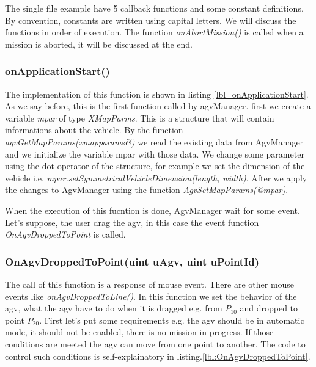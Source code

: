 The single file example have 5 callback functions and some constant definitions. By convention, constants are written using capital letters.
We will discuss the functions in order of execution. The function \textit{onAbortMission()} is called when a mission is aborted, it will be discussed at the end.

\subsubsection{onApplicationStart()}
The implementation of this function is shown in listing \ref{lbl_onApplicationStart}. As we say before, this is the first function called by agvManager.
first we create a variable \textit{mpar} of type \textit{XMapParms}. This is a structure that will contain informations about the vehicle.
By the function \textit{agvGetMapParams(xmapparams\&)} we read the existing data from AgvManager and we initialize the variable mpar with those data.
We change some parameter using the dot operator of the structure, for example we set the dimension of the vehicle i.e. \textit{mpar.setSymmetricalVehicleDimension(length, width)}. After we apply the changes to AgvManager using the function \textit{AgvSetMapParams(@mpar)}.

When the execution of this fucntion is done, AgvManager wait for some event. Let's suppose, the user drag the agv, in this case the event function \textit{OnAgvDroppedToPoint} is called.




\subsubsection{OnAgvDroppedToPoint(uint uAgv, uint uPointId) }
The call of this function is a response of mouse event. There are other mouse events like \textit{onAgvDroppedToLine()}.
In this function we set the behavior of the agv, what the agv have to do when it is dragged e.g. from $P_{10}$ and dropped to point $P_{20}$.
First let's put some requirements e.g. the agv should be in automatic mode, it should not be enabled, there is no mission in progress.
If those conditions are meeted the agv can move from one point to another. The code to control such conditions is self-explainatory in listing.\ref{lbl:OnAgvDroppedToPoint}.\\

